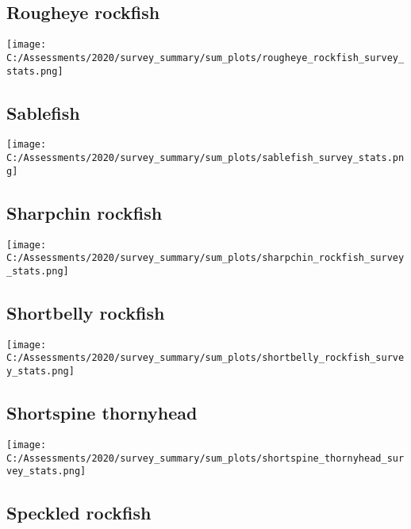\documentclass[12pt,]{article}
\begin{document}
\FloatBarrier

\hypertarget{rougheye-rockfish}{%
\subsection{Rougheye rockfish}\label{rougheye-rockfish}}

\texttt{[image: C:/Assessments/2020/survey\_summary/sum\_plots/rougheye\_rockfish\_survey\_stats.png]}
\FloatBarrier  

\hypertarget{sablefish}{%
\subsection{Sablefish}\label{sablefish}}

\texttt{[image: C:/Assessments/2020/survey\_summary/sum\_plots/sablefish\_survey\_stats.png]}
\FloatBarrier  

\hypertarget{sharpchin-rockfish}{%
\subsection{Sharpchin rockfish}\label{sharpchin-rockfish}}

\texttt{[image: C:/Assessments/2020/survey\_summary/sum\_plots/sharpchin\_rockfish\_survey\_stats.png]}
\FloatBarrier  

\hypertarget{shortbelly-rockfish}{%
\subsection{Shortbelly rockfish}\label{shortbelly-rockfish}}

\texttt{[image: C:/Assessments/2020/survey\_summary/sum\_plots/shortbelly\_rockfish\_survey\_stats.png]}
\FloatBarrier  

\hypertarget{shortspine-thornyhead}{%
\subsection{Shortspine thornyhead}\label{shortspine-thornyhead}}

\texttt{[image: C:/Assessments/2020/survey\_summary/sum\_plots/shortspine\_thornyhead\_survey\_stats.png]}
\FloatBarrier  

\hypertarget{speckled-rockfish}{%
\subsection{Speckled rockfish}\label{speckled-rockfish}}
\end{document}
